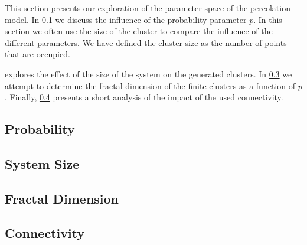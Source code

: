 This section presents our exploration of the parameter space of the percolation model. In \cref{ss:exp:probability} we discuss the influence of the probability parameter $p$. In this section we often use the size of the cluster to compare the influence of the different parameters. We have defined the cluster size as the number of points that are occupied. 

 explores the effect of the size of the system on the generated clusters. In \cref{ss:exp:fractal} we attempt to determine the fractal dimension of the finite clusters as a function of $p$. Finally, \cref{ss:exp:connectivity} presents a short analysis of the impact of the used connectivity.


\subsection{Probability}
\label{ss:exp:probability}


\subsection{System Size}
\label{ss:exp:systemSize}


\subsection{Fractal Dimension}
\label{ss:exp:fractal}
	

\subsection{Connectivity}
\label{ss:exp:connectivity}

